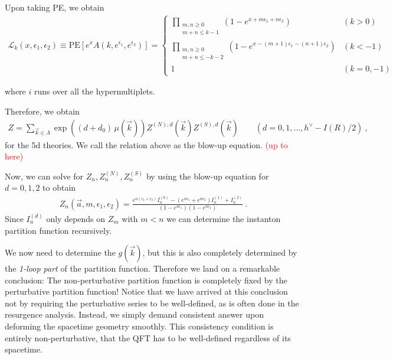\documentclass[letterpaper, 11pt]{article}
\def\e{\epsilon}
\begin{document}
Upon taking PE, we obtain
\begin{align}
\mathcal{L}_{k} (x, \e_1, \e_2) \equiv \textrm{PE}\left[ e^{x} A(k, e^{\e_1}, e^{\e_2}) \right] = 
\begin{cases}
 {\displaystyle \prod_{\substack{m, n \ge 0 \\ m+n \le k-1}} \left( 1-e^{x+ m \e_1 +n  \e_2}\right)} & (k > 0) \\
 {\displaystyle \prod_{\substack{m, n \ge 0 \\ m+n \le -k-2}} \left(1-e^{x -(m+1)\e_1 - (n+1)\e_2} \right)} & (k < -1)  \\
 1 & (k=0, -1)
\end{cases}
\end{align}   

where $i$ runs over all the hypermultiplets. 







Therefore, we obtain
\begin{align} \label{eq:blowup5d}
 Z = \sum_{\vec{k} \in \Lambda} \exp\left( (d+d_0)\, \mu(\vec{k}) \right) Z^{(N), d}(\vec{k})  Z^{(S), d}(\vec{k})  \qquad (d=0, 1, \ldots, h^\vee - I(R)/2 ) \ , 
\end{align} 
for the 5d theories. We call the relation above as the blow-up equation.  \textcolor{red}{(up to here)}




Now, we can solve for $Z_n, Z_n^{(N)}, Z_n^{(S)}$ by using the blow-up equation for $d=0, 1, 2$ to obtain
\begin{align}
 Z_n (\vec{a}, m, \e_1, \e_2) = \frac{e^{n(\e_1 + \e_2)} I_n^{(0)} - (e^{n\e_1} + e^{n \e_2}) I_n^{(1)} + I_n^{(2)} }{(1-e^{n\e_1})(1-e^{n\e_2})} \ . 
\end{align}
Since $I_n^{(d)}$ only depends on $Z_m$ with $m<n$ we can determine the instanton partition function recursively. 

We now need to determine the $g(\vec{k})$, but this is also completely determined by the \emph{1-loop part} of the partition function. Therefore we land on a remarkable conclusion: The non-perturbative partition function is completely fixed by the perturbative partition function! Notice that we have arrived at this conclusion not by requiring the perturbative series to be well-defined, as is often done in the resurgence analysis. Instead, we simply demand consistent answer upon deforming the spacetime geometry smoothly. This consistency condition is entirely non-perturbative, that the QFT has to be well-defined regardless of its spacetime. 
\end{document}

